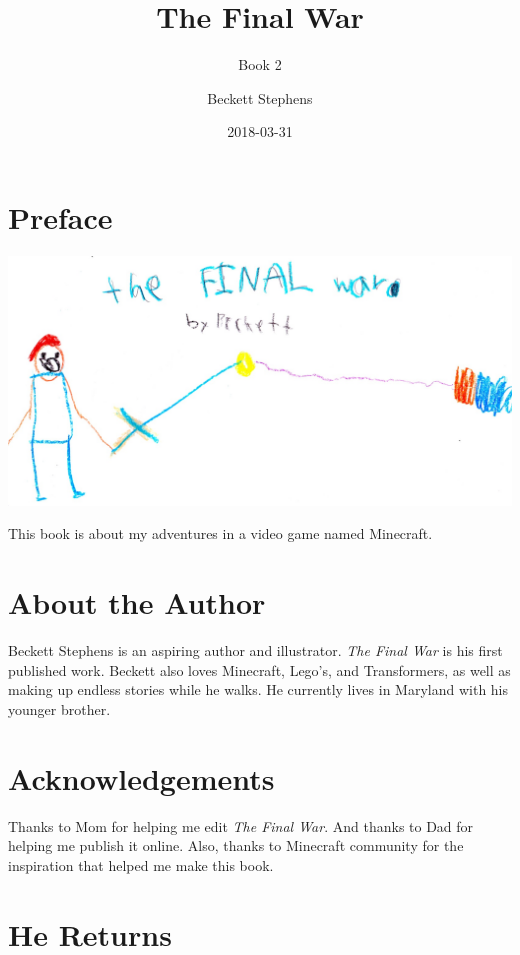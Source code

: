 \documentclass[oneside]{book}
\title{The Final War}
\subtitle{Book 2}
\author{Beckett Stephens}
\date{2018-03-31}
\begin{document}
\maketitle

{
\setcounter{tocdepth}{1}
\tableofcontents
}
\chapter*{Preface}\label{preface}

\includegraphics[width=6.25000in]{img/final-war.jpg}

This book is about my adventures in a video game named Minecraft.

\chapter*{About the Author}\label{about-the-author}

Beckett Stephens is an aspiring author and illustrator. \emph{The Final
War} is his first published work. Beckett also loves Minecraft, Lego's,
and Transformers, as well as making up endless stories while he walks.
He currently lives in Maryland with his younger brother.

\chapter*{Acknowledgements}\label{acknowledgements}

Thanks to Mom for helping me edit \emph{The Final War}. And thanks to
Dad for helping me publish it online. Also, thanks to Minecraft
community for the inspiration that helped me make this book.

\chapter{He Returns}\label{he-returns}
\end{document}
